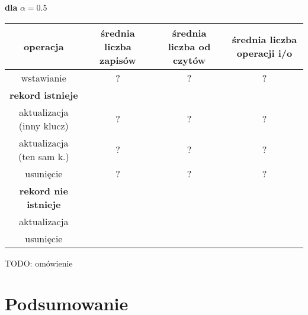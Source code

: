 \documentclass{article}
\begin{document}
\begin{center}
\textbf{dla} $\alpha = 0.5$ \\
\begin{tabular}{ c | c c | c}
 operacja & średnia liczba zapisów & średnia liczba od czytów & średnia liczba operacji i/o \\ 
\hline
 wstawianie & ? & ? & ? \\  
 \hline 
 \textbf{rekord istnieje}\\
 aktualizacja (inny klucz) & ? & ? & ? \\
 aktualizacja (ten sam k.) & ? & ? & ? \\
 usunięcie & ? & ? & ? \\
 \hline
 \textbf{rekord nie istnieje} \\
 aktualizacja \\
 usunięcie \\
\hline \hline 
\end{tabular}
\end{center}

TODO: omówienie
\section{Podsumowanie}
\end{document}
